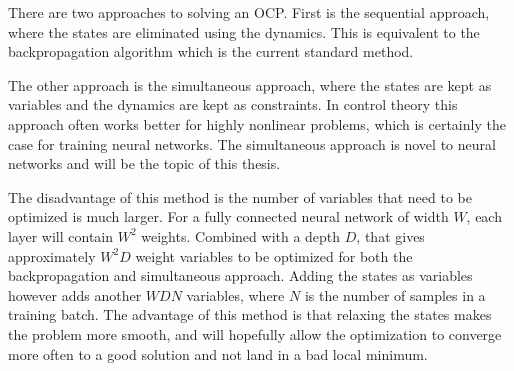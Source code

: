 There are two approaches to solving an OCP. First is the sequential approach, where the states are eliminated using the dynamics. This is equivalent to the backpropagation algorithm which is the current standard method.

The other approach is the simultaneous approach, where the states are kept as variables and the dynamics are kept as constraints. In control theory this approach often works better for highly nonlinear problems, which is certainly the case for training neural networks. The simultaneous approach is novel to neural networks and will be the topic of this thesis.

The disadvantage of this method is the number of variables that need to be optimized is much larger. For a fully connected neural network of width $W$, each layer will contain $W^2$ weights. Combined with a depth $D$, that gives approximately $W^2D$ weight variables to be optimized for both the backpropagation and simultaneous approach. Adding the states as variables however adds another $WDN$ variables, where $N$ is the number of samples in a training batch. The advantage of this method is that relaxing the states makes the problem more smooth, and will hopefully allow the optimization to converge more often to a good solution and not land in a bad local minimum.

